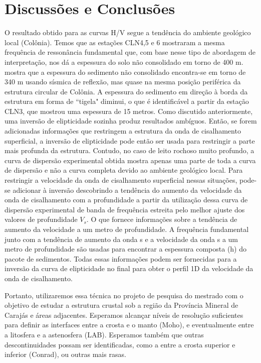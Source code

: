 \documentclass[smallextended]{svjour3}       %
\begin{document}

\section{Discussões e Conclusões}

O resultado obtido para as curvas H/V segue a tendência do ambiente geológico local (Colônia). Temos que as estações CLN4,5 e 6 mostraram a mesma frequência de ressonância fundamental que, com base nesse tipo de abordagem de interpretação, nos dá a espessura do solo não consolidado em torno de 400 m. \cite{riccomini2011colonia} mostra que a espessura do sedimento não consolidado encontra-se em torno de 340 m usando sísmica de reflexão, mas quase na mesma posição periférica da estrutura circular de Colônia. A espessura do sedimento em direção à borda da estrutura em forma de ``tigela" diminui, o que é identificável a partir da estação CLN3, que mostrou uma espessura de 15 metros. Como discutido anteriormente, uma inversão de elipticidade sozinha produz resultados ambíguos. Então, se forem adicionadas informações que restringem a estrutura da onda de cisalhamento superficial, a inversão de elipticidade pode então ser usada para restringir a parte mais profunda da estrutura. Contudo, no caso de leito rochoso muito profundo, a curva de dispersão experimental obtida mostra apenas uma parte de toda a curva de dispersão e não a curva completa devido ao ambiente geológico local. Para restringir a velocidade da onda de cisalhamento superficial nessas situações, pode-se adicionar à inversão descobrindo a tendência do aumento da velocidade da onda de cisalhamento com a profundidade a partir da utilização dessa curva de dispersão experimental de banda de frequência estreita pelo melhor ajuste dos valores de profundidade $V_s$. O que fornece informações sobre a tendência de aumento da velocidade a um metro de profundidade. A frequência fundamental junto com a tendência de aumento da onda s e a velocidade da onda s a um metro de profundidade são usadas para encontrar a espessura composta (h) do pacote de sedimentos. Todas essas informações podem ser fornecidas para a inversão da curva de elipticidade no final para obter o perfil 1D da velocidade da onda de cisalhamento.

Portanto, utilizaremos essa técnica no projeto de pesquisa do mestrado com o objetivo de estudar a estrutura crustal sob a região da Província Mineral de Carajás e áreas adjacentes. Esperamos alcançar níveis de resolução suficientes para definir as interfaces entre a crosta e o manto (Moho), e eventualmente entre a litosfera e a astenosfera (LAB). Esperamos também que outras descontinuidades possam ser identificadas, como a entre a crosta superior e inferior (Conrad), ou outras mais rasas. 
\end{document}
